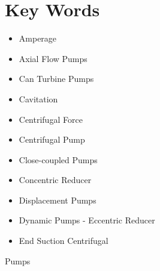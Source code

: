 \documentclass[10pt]{article}
\begin{document}
\section{Key Words}
\begin{itemize}
  \item Amperage

  \item Axial Flow Pumps

  \item Can Turbine Pumps

  \item Cavitation

  \item Centrifugal Force

  \item Centrifugal Pump

  \item Close-coupled Pumps

  \item Concentric Reducer

  \item Displacement Pumps

  \item Dynamic Pumps - Eccentric Reducer

  \item End Suction Centrifugal

\end{itemize}
Pumps
\end{document}
